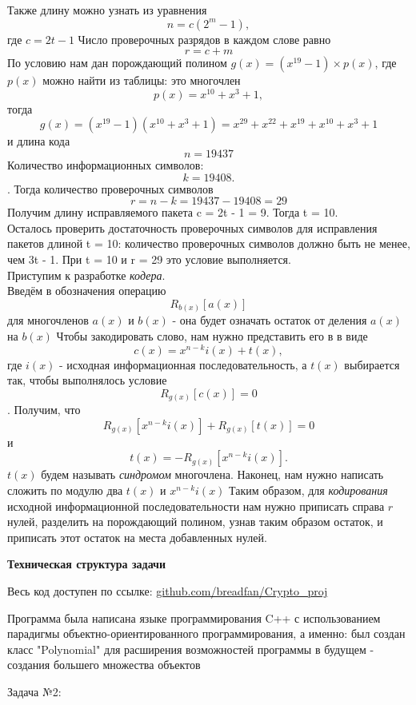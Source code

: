 \documentclass{article}
\begin{document}
   		Также длину можно узнать из уравнения $$n = c(2^m - 1),$$где $c = 2t - 1$
   		Число проверочных разрядов в каждом слове равно
   		$$r = c + m$$ 
   		По условию нам дан порождающий полином $g(x) = (x^{19} - 1) \times p(x)$, где $p(x)$ можно найти из таблицы: это многочлен  $$p(x) = x^{10} + x^3 + 1,$$ тогда $$g(x) = (x^{19} - 1)(x^{10} + x^3 + 1) = x^{29} + x^{22} + x^{19} + x^{10} + x^3 + 1$$  и длина кода $$n = 19437$$ Количество информационных символов: $$k = 19408.$$. Тогда количество проверочных символов $$r = n - k = 19437 - 19408 = 29$$
   		Получим длину исправляемого пакета c = 2t - 1 = 9. Тогда t = 10.\\
   		Осталось проверить достаточность проверочных символов для исправления пакетов длиной t = 10: количество проверочных символов должно быть не менее, чем 3t - 1. При t = 10 и r = 29 это условие выполняется.\\  
   		
   		Приступим к разработке \textit{кодера}.\\
   		Введём в обозначения операцию $$R_{b(x)}[a(x)]$$ для многочленов $a(x)$ и $b(x)$ - она будет означать остаток от деления $a(x)$ на $b(x)$ 
   		Чтобы закодировать слово, нам нужно представить его в в виде $$c(x) = x^{n - k}i(x) + t(x),$$ где $i(x)$ - исходная информационная последовательность, а $t(x)$ выбирается так, чтобы выполнялось условие $$R_{g(x)}[c(x)] = 0$$.
   		Получим, что $$R_{g(x)}[x^{n - k}i(x)] + R_{g(x)}[t(x)] = 0$$ и  $$t(x) = -R_{g(x)}[x^{n - k}i(x)].$$
   		$t(x)$ будем называть \textit{синдромом} многочлена. Наконец, нам нужно написать сложить по модулю два $t(x)$ и $x^{n - k}i(x)$
   		Таким образом, для \textit{кодирования} исходной информационной последовательности нам нужно приписать справа $r$ нулей, разделить на порождающий полином, узнав таким образом остаток, и приписать этот остаток на места добавленных нулей.
   		\begin{center}
   			\large \textbf {Техническая структура задачи}
   			
   			\large Весь код доступен по ссылке: \href{https://github.com/breadfan/Crypto_proj}{github.com/breadfan/Crypto\_proj}
   		\end{center}	
   		Программа была написана языке программирования C++ с использованием парадигмы объектно-ориентированного программирования, а именно: был создан класс "Polynomial" для расширения возможностей программы в будущем - создания бо$\acute{}$льшего множества объектов 
   		 
   	\newpage
   		\begin{center}
   			\textbf \large{Задача №2:}
   		\end{center} 
   		
\end{document}
